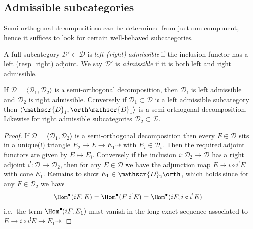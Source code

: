 \subsection{Admissible subcategories} Semi-orthogonal decompositions can be
determined from just one component, hence it suffices to look for certain
well-behaved subcategories.

\begin{definition}
    A full subcategory \(\mathscr{D}'\subset \mathscr{D}\) is \textit{left
    (right) admissible} if the inclusion functor has a left (resp.\ right)
    adjoint. We say \(\mathscr{D}'\) is \textit{admissible} if it is both left
    and right admissible.
\end{definition}

\begin{proposition}
    If \(\mathscr{D}=\langle \mathscr{D}_1,\mathscr{D}_2\rangle\) is a
    semi-orthogonal decomposition, then \(\mathscr{D}_1\) is left admissible and
    \(\mathscr{D}_2\) is right admissible. Conversely if \(\mathscr{D}_1\subset
    \mathscr{D}\) is a left admissible subcategory then \(\langle
    \mathscr{D}_1, \orth \mathscr{D}_1\rangle\) is a semi-orthogonal
    decomposition. Likewise for right admissible subcategories
    \(\mathscr{D}_2\subset \mathscr{D}\).

    \begin{proof}
        If \(\mathscr{D}=\langle \mathscr{D}_1,\mathscr{D}_2\rangle\) is a
        semi-orthogonal decomposition then every \(E\in \mathscr{D}\) sits in a
        unique(!) triangle \(E_2\to E\to E_1\dashrightarrow\) with \(E_i\in
        \mathscr{D}_i\). Then the required adjoint functors are given by
        \(E\mapsto E_i\). Conversely if the inclusion \(i:\mathscr{D}_2\to
        \mathscr{D}\) has a right adjoint \(i^!:\mathscr{D}\to \mathscr{D}_2\),
        then for any \(E\in \mathscr{D}\) we have the adjunction map \(E\to
        i\circ i^!E\) with cone \(E_1\). Remains to show \(E_1\in
        \mathscr{D}_2\orth\), which holds since for any \(F\in \mathscr{D}_2\)
        we have \[\Hom^\bullet(iF, E)=\Hom^\bullet(F,i^!E)=\Hom^\bullet(iF,
        i\circ i^!E)\] i.e.\ the term \(\Hom^\bullet(iF, E_1)\) must vanish in
        the long exact sequence associated to \(E\to i\circ i^!E\to
        E_1\dashrightarrow\).
    \end{proof}
\end{proposition}


